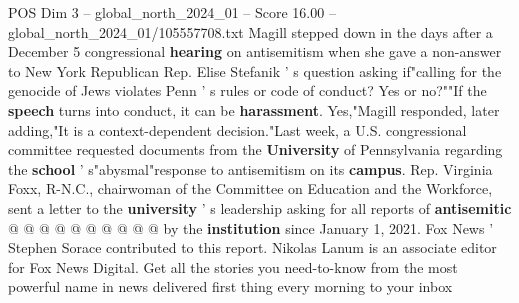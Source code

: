 \begin{textsample}{POS Dim 3 – global\_north\_2024\_01 – Score 16.00 – global\_north\_2024\_01/105557708.txt}
Magill stepped down in the days after a December 5 congressional \textbf{hearing} on antisemitism when she gave a non-answer to New York Republican Rep.
Elise Stefanik ' s question asking if"calling for the genocide of Jews violates Penn ' s rules or code of conduct?
Yes or no?""If the \textbf{speech} turns into conduct, it can be \textbf{harassment}.
Yes,"Magill responded, later adding,"It is a context-dependent decision."Last week, a U.S. congressional committee requested documents from the \textbf{University} of Pennsylvania regarding the \textbf{school} ' s"abysmal"response to antisemitism on its \textbf{campus}.
Rep.
Virginia Foxx, R-N.C., chairwoman of the Committee on Education and the Workforce, sent a letter to the \textbf{university} ' s leadership asking for all reports of \textbf{antisemitic} @ @ @ @ @ @ @ @ @ @ by the \textbf{institution} since January 1, 2021.
Fox News ' Stephen Sorace contributed to this report.
Nikolas Lanum is an associate editor for Fox News Digital.
Get all the stories you need-to-know from the most powerful name in news delivered first thing every morning to your inbox

\end{textsample}
